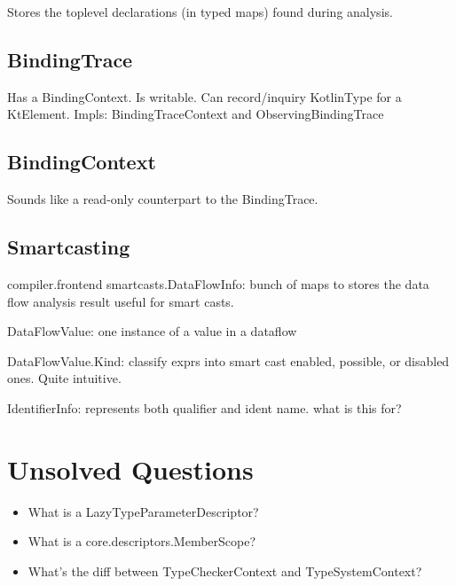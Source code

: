 \documentclass{article}
\begin{document}
Stores the toplevel declarations (in typed maps) found during analysis.

\subsection{BindingTrace}

Has a BindingContext. Is writable. Can record/inquiry KotlinType for a KtElement.
Impls: BindingTraceContext and ObservingBindingTrace

\subsection{BindingContext}

Sounds like a read-only counterpart to the BindingTrace.

\subsection{Smartcasting}

compiler.frontend smartcasts.DataFlowInfo: bunch of maps to stores the data flow analysis result useful for smart casts.

DataFlowValue: one instance of a value in a dataflow

DataFlowValue.Kind: classify exprs into smart cast enabled, possible, or disabled ones. Quite intuitive.

IdentifierInfo: represents both qualifier and ident name. what is this for?

\section{Unsolved Questions}

\begin{itemize}
    \item What is a LazyTypeParameterDescriptor?
    \item What is a core.descriptors.MemberScope?
    \item What's the diff between TypeCheckerContext and TypeSystemContext?
\end{itemize}
\end{document}
